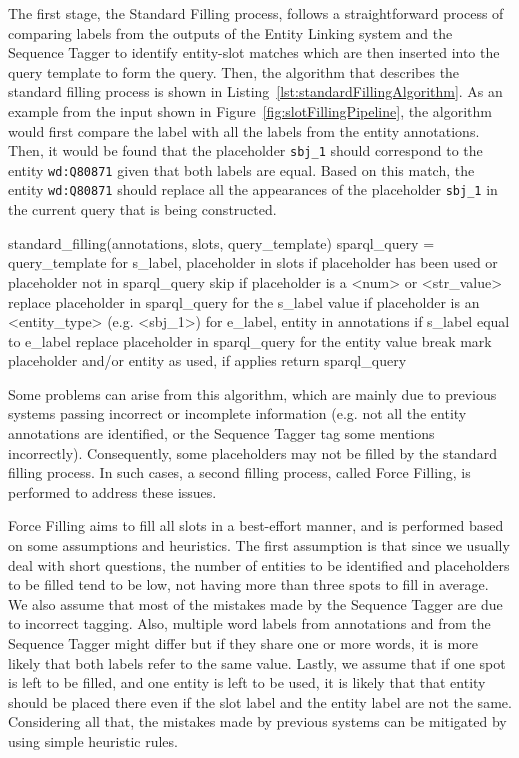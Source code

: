 The first stage, the Standard Filling process, follows a straightforward process of comparing 
labels from the outputs of the Entity Linking system and the Sequence Tagger to identify 
entity-slot matches which are then inserted into the query template to form the \SPARQL{} query. 
Then, the algorithm that describes the standard filling process is shown in 
Listing~\ref{lst:standardFillingAlgorithm}. As an example from the input shown in 
Figure~\ref{fig:slotFillingPipeline}, the algorithm would first compare the label 
 with all the labels from the entity annotations. Then, it would 
be found that the placeholder \texttt{sbj\_1} should correspond to the entity 
\texttt{wd:Q80871} given that both labels are equal. Based on this match, the entity 
\texttt{wd:Q80871} should replace all the appearances of the placeholder \texttt{sbj\_1} in 
the current \SPARQL{} query that is being constructed.

\begin{sparqlcode}[%
    caption={Standard Filling algorithm.}, 
    label={lst:standardFillingAlgorithm}]
standard_filling(annotations, slots, query_template)
    sparql_query = query_template
    for s_label, placeholder in slots
        if placeholder has been used or placeholder not in sparql_query
            skip
        if placeholder is a <num> or <str_value>
            replace placeholder in sparql_query for the s_label value
        if placeholder is an <entity_type> (e.g. <sbj_1>)
            for e_label, entity in annotations
                if s_label equal to e_label
                    replace placeholder in sparql_query for the entity value
                    break
        mark placeholder and/or entity as used, if applies
    return sparql_query
\end{sparqlcode}

Some problems can arise from this algorithm, which are mainly due to previous systems passing 
incorrect or incomplete information (e.g. not all the entity annotations are identified, or 
the Sequence Tagger tag some mentions incorrectly). Consequently, some placeholders may not 
be filled by the standard filling process. In such cases, a second filling process, called 
Force Filling, is performed to address these issues.

Force Filling aims to fill all slots in a best-effort manner, and is performed based on some 
assumptions and heuristics. The first assumption is that since we usually deal with short 
questions, the number of entities to be identified and placeholders to be filled tend to be 
low, not having more than three spots to fill in average. We also assume that most of the 
mistakes made by the Sequence Tagger are due to incorrect tagging. Also, multiple word labels 
from annotations and from the Sequence Tagger might differ but if they share one or more 
words, it is more likely that both labels refer to the same value. Lastly, we assume that if 
one spot is left to be filled, and one entity is left to be used, it is likely that that 
entity should be placed there even if the slot label and the entity label are not the same. 
Considering all that, the mistakes made by previous systems can be mitigated by using simple 
heuristic rules. 

